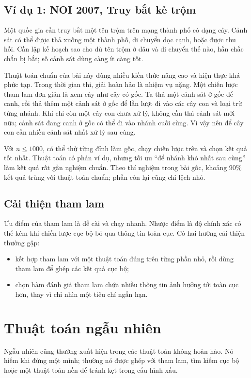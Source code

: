 \documentclass[11pt]{article}
\begin{document}
\subsection{Ví dụ 1: NOI 2007, Truy bắt kẻ trộm}

Một quốc gia cần truy bắt một tên trộm trên mạng thành phố có dạng cây. Cảnh
sát có thể được thả xuống một thành phố, di chuyển dọc cạnh, hoặc được thu hồi.
Cần lập kế hoạch sao cho dù tên trộm ở đâu và di chuyển thế nào, hắn chắc
chắn bị bắt; số cảnh sát dùng càng ít càng tốt.

Thuật toán chuẩn của bài này dùng nhiều kiến thức nâng cao và hiện thực khá
phức tạp. Trong thời gian thi, giải hoàn hảo là nhiệm vụ nặng. Một chiến lược
tham lam đơn giản là xem cây như cây có gốc. Ta thả một cảnh sát ở gốc để
canh, rồi thả thêm một cảnh sát ở gốc để lần lượt đi vào các cây con và loại
trừ từng nhánh. Khi chỉ còn một cây con chưa xử lý, không cần thả cảnh sát mới
nữa; cảnh sát đang canh ở gốc có thể đi vào nhánh cuối cùng. Vì vậy nên để
cây con cần nhiều cảnh sát nhất xử lý sau cùng.

Với \(n\le 1000\), có thể thử từng đỉnh làm gốc, chạy chiến lược trên và chọn
kết quả tốt nhất. Thuật toán có phản ví dụ, nhưng tối ưu ``để nhánh khó nhất
sau cùng'' làm kết quả rất gần nghiệm chuẩn. Theo thí nghiệm trong bài gốc,
khoảng \(90\%\) kết quả trùng với thuật toán chuẩn; phần còn lại cũng chỉ lệch
nhỏ.

\subsection{Cải thiện tham lam}

Ưu điểm của tham lam là dễ cài và chạy nhanh. Nhược điểm là độ chính xác có
thể kém khi chiến lược cục bộ bỏ qua thông tin toàn cục. Có hai hướng cải
thiện thường gặp:
\begin{itemize}
  \item kết hợp tham lam với một thuật toán đúng trên từng phần nhỏ, rồi dùng
  tham lam để ghép các kết quả cục bộ;
  \item chọn hàm đánh giá tham lam chứa nhiều thông tin ảnh hưởng tới toàn
  cục hơn, thay vì chỉ nhìn một tiêu chí ngắn hạn.
\end{itemize}

\section{Thuật toán ngẫu nhiên}

Ngẫu nhiên cũng thường xuất hiện trong các thuật toán không hoàn hảo. Nó hiếm
khi đứng một mình; thường nó được ghép với tham lam, tìm kiếm cục bộ hoặc một
thuật toán nền để tránh kẹt trong cấu hình xấu.
\end{document}
